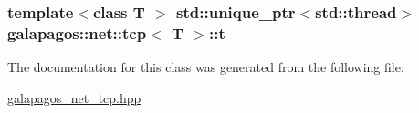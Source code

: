 \subsubsection[{\texorpdfstring{t}{t}}]{\setlength{\rightskip}{0pt plus 5cm}template$<$class T $>$ std\+::unique\+\_\+ptr$<$std\+::thread$>$ {\bf galapagos\+::net\+::tcp}$<$ {\bf T} $>$\+::t}\hypertarget{classgalapagos_1_1net_1_1tcp_a4820fa1fc2a4a396eaf0554042873643}{}\label{classgalapagos_1_1net_1_1tcp_a4820fa1fc2a4a396eaf0554042873643}


The documentation for this class was generated from the following file\+:\begin{DoxyCompactItemize}
\item 
\hyperlink{galapagos__net__tcp_8hpp}{galapagos\+\_\+net\+\_\+tcp.\+hpp}\end{DoxyCompactItemize}
